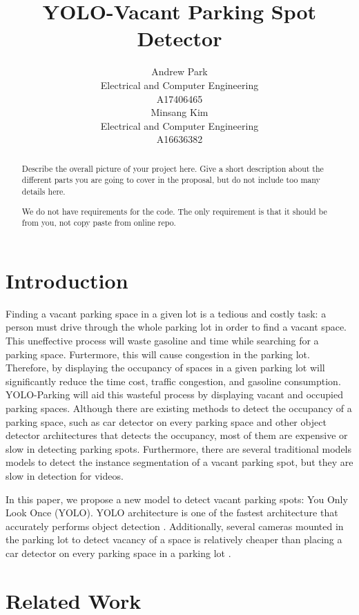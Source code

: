 \documentclass{article}
\title{YOLO-Vacant Parking Spot Detector}
\author{%
  Andrew Park \\
  Electrical and Computer Engineering\\
  A17406465\\
  \And
  Minsang Kim \\
  Electrical and Computer Engineering\\
  A16636382 \\
}
\begin{document}
\maketitle

\begin{abstract}
    Describe the overall picture of your project here. Give a short description about the different parts you are going to cover in the proposal, but do not include too many details here.
    
    We do not have requirements for the code. The only requirement is that it should be from you, not copy paste from online repo.
    

\end{abstract}

\section{Introduction}

Finding a vacant parking space in a given lot is a tedious and costly task: a person must drive through the whole parking lot in order to find a vacant space. This uneffective process will 
waste gasoline and time while searching for a parking space. Furtermore, this will cause congestion in the parking lot. Therefore, by displaying the occupancy of spaces in a given parking lot
will significantly reduce the time cost, traffic congestion, and gasoline consumption. YOLO-Parking will aid this wasteful process by displaying vacant and
occupied parking spaces. Although there are existing methods to detect the occupancy of a parking space, such as car detector on every parking space and other object detector architectures 
that detects the occupancy, most of them are expensive or slow in detecting parking spots\cite{DBLP:journals/corr/abs-2107-12207}. Furthermore, there are several traditional models  models 
to detect the instance segmentation of a vacant parking spot, but they are slow in detection for videos. 

In this paper, we propose a new model to detect vacant parking spots: You Only Look Once (YOLO). YOLO architecture is one of the fastest architecture that accurately performs object detection \cite{redmon2016look}. 
Additionally, several cameras mounted in the parking lot to detect vacancy of a space is relatively cheaper than placing a car detector on every parking space in a parking lot \cite{DBLP:journals/corr/abs-2107-12207}. 



\section{Related Work}
\end{document}
